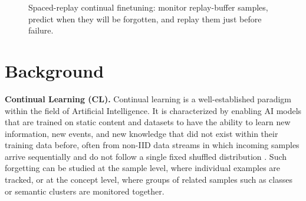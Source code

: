 \documentclass{article}
\begin{document}
\begin{figure}[t]
\centering
{}
\caption{Spaced-replay continual finetuning: monitor replay-buffer samples, predict when they will be forgotten, and replay them just before failure.}
\label{fig:compact_visual_abstract}
\end{figure}

\section{Background}
\label{sec:background}
\textbf{Continual Learning (CL).}
Continual learning is a well-established paradigm within the field of Artificial Intelligence. It is characterized by enabling AI models that are trained on static content and datasets to have the ability to learn new information, new events, and new knowledge that did not exist within their training data before, often from non-IID data streams in which incoming samples arrive sequentially and do not follow a single fixed shuffled distribution \citep{wang2024comprehensive}. Such forgetting can be studied at the sample level, where individual examples are tracked, or at the concept level, where groups of related samples such as classes or semantic clusters are monitored together.   
\end{document}
